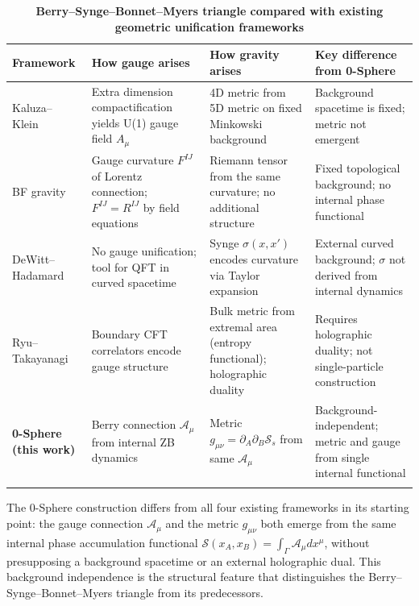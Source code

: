 \documentclass[%
 reprint, amsmath,amssymb, aps, prd, ]{revtex4-2}
\numberwithin{equation}{section}
\newcommand{\BerryA}{\mathcal{A}}
\newcommand{\SyngeS}{\mathcal{S}}
\begin{document}
\begin{table}[t!]
\centering
\caption{\textbf{Berry--Synge--Bonnet--Myers triangle compared with existing geometric unification frameworks}}
\label{tab:comparison}
\renewcommand{\arraystretch}{1.4}
\begin{tabular}{p{3.2cm}p{4.0cm}p{4.0cm}p{4.3cm}}
\toprule
\textbf{Framework} & \textbf{How gauge arises} & \textbf{How gravity arises} & \textbf{Key difference from 0-Sphere} \\
\midrule
Kaluza--Klein~\cite{Kaluza1921,Klein1926}
& Extra dimension compactification yields U(1) gauge field $A_\mu$
& 4D metric from 5D metric on fixed Minkowski background
& Background spacetime is fixed; metric not emergent \\
\addlinespace[0.3cm]
BF gravity~\cite{Plebanski1977}
& Gauge curvature $F^{IJ}$ of Lorentz connection; $F^{IJ} = R^{IJ}$ by field equations
& Riemann tensor from the same curvature; no additional structure
& Fixed topological background; no internal phase functional \\
\addlinespace[0.3cm]
DeWitt--Hadamard~\cite{DeWitt1965,Hadamard1923}
& No gauge unification; tool for QFT in curved spacetime
& Synge $\sigma(x,x')$ encodes curvature via Taylor expansion
& External curved background; $\sigma$ not derived from internal dynamics \\
\addlinespace[0.3cm]
Ryu--Takayanagi~\cite{RyuTakayanagi2006}
& Boundary CFT correlators encode gauge structure
& Bulk metric from extremal area (entropy functional); holographic duality
& Requires holographic duality; not single-particle construction \\
\addlinespace[0.3cm]
\textbf{0-Sphere (this work)}
& Berry connection $\BerryA_\mu$ from internal ZB dynamics
& Metric $g_{\mu\nu} = \partial_A\partial_B\SyngeS_s$ from same $\BerryA_\mu$
& Background-independent; metric and gauge from single internal functional \\
\addlinespace[0.2cm]
\bottomrule
\end{tabular}
\vspace{0.2cm}
\begin{minipage}{0.95\textwidth}
\justifying\footnotesize
The 0-Sphere construction differs from all four existing frameworks in its starting point: the gauge connection $\BerryA_\mu$ and the metric $g_{\mu\nu}$ both emerge from the same internal phase accumulation functional $\SyngeS(x_A,x_B) = \int_\Gamma \BerryA_\mu dx^\mu$, without presupposing a background spacetime or an external holographic dual. This background independence is the structural feature that distinguishes the Berry--Synge--Bonnet--Myers triangle from its predecessors.
\end{minipage}
\end{table}
\end{document}
